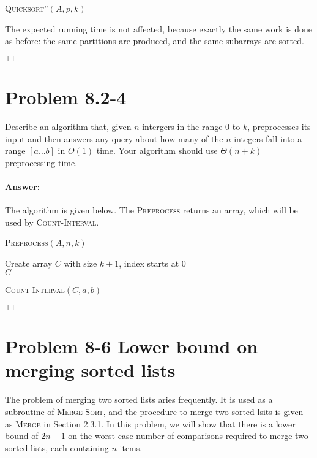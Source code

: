 \documentclass[a4paper,10pt]{article}
\newcommand{\problem}[1]{\section*{Problem #1}}
\newcommand{\answer}{\paragraph{Answer:}}
\newcommand{\qed}{\hfill \ensuremath{\Box}}
\begin{document}
\begin{description}
 \begin{algorithm}[H]
 \caption{\textsc{Quicksort''}$(A, p, k)$}
 \end{algorithm}
 
 The expected running time is not affected, because exactly the same work is done as before:
 the same partitions are produced, and the same subarrays are sorted.

\end{description}

\qed

\problem{8.2-4}
Describe an algorithm that, given $n$ intergers in the range 0 to $k$, preprocesses its input and then answers
any query about how many of the $n$ integers fall into a range
$[a\ldots b]$ in $O(1)$ time. Your algorithm should use $\Theta(n + k)$ preprocessing time.
\answer

The algorithm is given below. The \textsc{Preprocess} returns an array, which will be used by \textsc{Count-Interval}.

\begin{algorithm}[H]
\caption{\textsc{Preprocess}$(A, n, k)$}
Create array $C$ with size $k + 1$, index starts at $0$\\
\Return $C$
\end{algorithm}

\begin{algorithm}[H]
\caption{\textsc{Count-Interval}$(C, a, b)$}
\end{algorithm}
\qed



\problem{8-6 Lower bound on merging sorted lists}

The problem of merging two sorted lists aries frequently. It is used as a subroutine of \textsc{Merge-Sort},
and the procedure to merge two sorted lsits is given as \textsc{Merge} in Section 2.3.1. In this problem,
we will show that there is a lower bound of $2n-1$ on the worst-case number of comparisons required to 
merge two sorted lists, each containing $n$ items.
\end{document}
